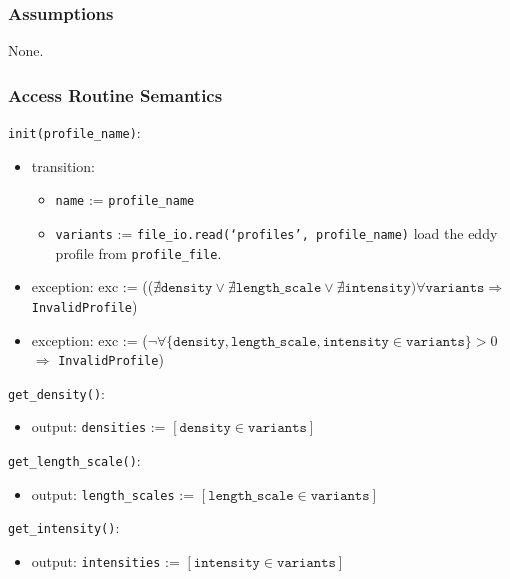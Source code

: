 \documentclass[12pt, titlepage]{article}
\begin{document}
\subsubsection{Assumptions}
None.

\subsubsection{Access Routine Semantics}

\noindent \texttt{init(profile\_name)}:
\begin{itemize}
\item transition:
  \begin{itemize}
    \item \texttt{name} := \texttt{profile\_name}
    \item \texttt{variants} := \texttt{file\_io.read(`profiles', profile\_name)} load the eddy profile from \texttt{profile\_file}.
  \end{itemize}
\item exception: exc := (($\nexists \texttt{density} \vee \nexists \texttt{length\_scale} \vee \nexists \texttt{intensity}) \forall \texttt{variants} \Rightarrow$ \texttt{InvalidProfile})
\item exception: exc := ($\neg \forall \{\texttt{density}, \texttt{length\_scale}, \texttt{intensity} \in \texttt{variants}\} >0$ $\Rightarrow$ \texttt{InvalidProfile})
\end{itemize}

\noindent \texttt{get\_density()}:
\begin{itemize}
\item output: \texttt{densities} := $[\texttt{density} \in \texttt{variants}]$
\end{itemize}

\noindent \texttt{get\_length\_scale()}:
\begin{itemize}
\item output: \texttt{length\_scales} := $[\texttt{length\_scale} \in \texttt{variants}]$
\end{itemize}

\noindent \texttt{get\_intensity()}:
\begin{itemize}
\item output: \texttt{intensities} := $[\texttt{intensity} \in \texttt{variants}]$
\end{itemize}
\end{document}
